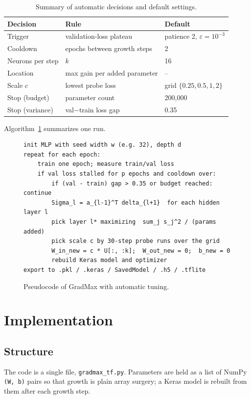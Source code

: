 \documentclass[11pt,a4paper]{article}
\newcommand{\code}[1]{\texttt{#1}}
\begin{document}
\begin{table}[h]
\centering
\caption{Summary of automatic decisions and default settings.}
\begin{tabular}{@{}lll@{}}
\toprule
Decision & Rule & Default \\
\midrule
Trigger & validation-loss plateau & patience 2, $\varepsilon=10^{-3}$ \\
Cooldown & epochs between growth steps & 2 \\
Neurons per step & $k$ & 16 \\
Location & max gain per added parameter & -- \\
Scale $c$ & lowest probe loss & grid $\{0.25,0.5,1,2\}$ \\
Stop (budget) & parameter count & 200{,}000 \\
Stop (variance) & val$-$train loss gap & 0.35 \\
\bottomrule
\end{tabular}
\end{table}

Algorithm~\ref{alg:gm} summarizes one run.

\begin{figure}[h]
\centering
\begin{minipage}{0.92\linewidth}
\begin{lstlisting}[mathescape=true]
init MLP with seed width w (e.g. 32), depth d
repeat for each epoch:
    train one epoch; measure train/val loss
    if val loss stalled for p epochs and cooldown over:
        if (val - train) gap > 0.35 or budget reached: continue
        Sigma_l = a_{l-1}^T delta_{l+1}  for each hidden layer l
        pick layer l* maximizing  sum_j s_j^2 / (params added)
        pick scale c by 30-step probe runs over the grid
        W_in_new = c * U[:, :k];  W_out_new = 0;  b_new = 0
        rebuild Keras model and optimizer
export to .pkl / .keras / SavedModel / .h5 / .tflite
\end{lstlisting}
\end{minipage}
\caption{Pseudocode of GradMax with automatic tuning.}
\label{alg:gm}
\end{figure}

\section{Implementation}
\subsection{Structure}
The code is a single file, \code{gradmax\_tf.py}. Parameters are held as a list of NumPy \code{(W, b)} pairs so that growth is plain array surgery; a Keras model is rebuilt from them after each growth step.
\end{document}
